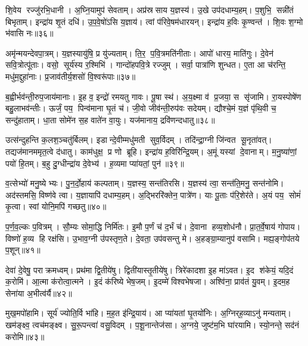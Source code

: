शि॒वेय रज्जु॑रभि॒धानी।
अ॒घ्नि॒यामुप॑ सेवताम्।
अप्र॑स्रसाय य॒ज्ञस्य॑।
उ॒खे उप॑दधाम्य॒हम्।
प॒शुभि॒ सन्नी॑तं बिभृताम्।
इन्द्रा॑य शृ॒तं दधि॑।
उ॒प॒वे॒षो॑ऽसि य॒ज्ञाय॑।
त्वां प॑रिवे॒षम॑धारयन्।
इन्द्रा॑य ह॒विः कृ॒ण्वन्त॑।
शि॒वः श॒ग्मो भ॑वासि नः॥३६॥

अमृ॑न्मयन्देवपा॒त्रम्।
य॒ज्ञस्यायु॑षि॒ प्र यु॑ज्यताम्।
ति॒र॒ प॒वि॒त्रमति॑नीताः।
आपो॑ धारय॒ माति॑गुः।
दे॒वेन॑ सवि॒त्रोत्पू॑ताः।
वसो॒ सूर्य॑स्य र॒श्मिभि॑।
गान्दो॑हपवि॒त्रे रज्जुम्।
सर्वा॒ पात्रा॑णि शुन्धत।
ए॒ता आ च॑रन्ति॒ मधु॑म॒द्दुहा॑नाः।
प्र॒जाव॑तीर्य॒शसो॑ वि॒श्वरू॑पाः॥३७॥

ब॒ह्वीर्भव॑न्ती॒रुप॒जाय॑मानाः।
इ॒ह व॒ इन्द्रो॑ रमयतु गावः।
पू॒षा स्थ॑।
अ॒य॒क्ष्मा व॑ प्र॒जया॒ स सृ॑जामि।
रा॒यस्पोषे॑ण बहु॒लाभव॑न्तीः।
ऊर्जं॒ पय॒ पिन्व॑माना घृ॒तं च॑।
जी॒वो जीव॑न्ती॒रुप॑वः सदेयम्।
द्यौश्चे॒मं य॒ज्ञं पृ॑थि॒वी च॒ सन्दु॑हाताम्।
धा॒ता सोमे॑न स॒ह वाते॑न वा॒युः।
यज॑मानाय॒ द्रवि॑णन्दधातु॥३८॥

उत्स॑न्दुहन्ति क॒लश॒ञ्चतु॑र्बिलम्।
इडान्दे॒वीम्मधु॑मती सुव॒र्विदम्।
तदि॑न्द्रा॒ग्नी जि॑न्वत सू॒नृता॑वत्।
तद्यज॑मानममृत॒त्वे द॑धातु।
काम॑धुक्ष॒ प्र णो ब्रूहि।
इन्द्रा॑य ह॒विरि॑न्द्रि॒यम्।
अ॒मूं यस्यां दे॒वानाम्।
म॒नु॒ष्या॑णां॒ पयो॑ हि॒तम्।
ब॒हु दु॒ग्धीन्द्रा॑य दे॒वेभ्य॑।
ह॒व्यमा प्या॑यतां॒ पुन॑॥३९॥

व॒त्सेभ्यो॑ मनु॒ष्येभ्यः।
पु॒न॒र्दो॒हाय॑ कल्पताम्।
य॒ज्ञस्य॒ सन्त॑तिरसि।
य॒ज्ञस्य॑ त्वा॒ सन्त॑ति॒मनु॒ सन्त॑नोमि।
अद॑स्तमसि॒ विष्ण॑वे त्वा।
य॒ज्ञायापि॑ दधाम्य॒हम्।
अ॒द्भिररि॑क्तेन॒ पात्रे॑ण।
याः पू॒ताः प॑रि॒शेर॑ते।
अ॒यं पय॒ सोमं॑ कृ॒त्वा।
स्वां योनि॒मपि॑ गच्छतु॥४०॥

प॒र्ण॒व॒ल्कः प॒वित्रम्।
सौ॒म्यः सोमा॒द्धि निर्मि॑तः।
इ॒मौ प॒र्णं च॑ द॒र्भं च॑।
दे॒वाना हव्य॒शोध॑नौ।
प्रा॒त॒र्वे॒षाय॑ गोपाय।
विष्णो॑ ह॒व्य हि रक्ष॑सि।
उ॒भाव॒ग्नी उ॑पस्तृण॒ते।
दे॒वता॒ उप॑वसन्तु मे।
अ॒हङ्ग्रा॒म्यानुप॑ वसामि।
मह्य॒ङ्गोप॑तये प॒शून्॥४१॥\anuvakamend[आभृ॑त इ॒मं गृ॑ह्णामि॒ पूर्व॒स्ताः पूर्व॒ परि॑गृह्णामि सभापा॒ला इन्द्र॑ज्येष्ठेभ्य॒ आदि॑त्य व्रतपते सुस॒म्भृता॑ मे स॒ह पु॑नातु गहि नो वि॒श्वरू॑पा दधातु॒ पुन॑र्गच्छतु प॒शून् (याः पु॒रस्ता॑दि॒मामूर्ज॑मि॒ह प्र॒जा इ॒ह प॒शवो॒ऽयं पि॑तृ॒णाम॒ग्निः।
)]

देवा॑ दे॒वेषु॒ पराक्रमध्वम्।
प्रथ॑मा द्वि॒तीये॑षु।
द्विती॑यास्तृ॒तीये॑षु।
त्रिरे॑कादशा इ॒ह मा॑ऽवत।
इ॒द श॑केयं॒ यदि॒दं क॒रोमि॑।
आ॒त्मा क॑रोत्वा॒त्मने।
इ॒दं क॑रिष्ये भेष॒जम्।
इ॒दम्मे॑ विश्वभेषजा।
अश्वि॑ना॒ प्राव॑तं यु॒वम्।
इ॒दम॒ह सेना॑या अ॒भीत्व॑र्यै॥४२॥

मुख॒मपो॑हामि।
सूर्य॑ ज्योति॒र्वि भा॑हि।
म॒ह॒त इ॑न्द्रि॒याय॑।
आ प्या॑यतां घृ॒तयो॑निः।
अ॒ग्निर्‌ह॒व्याऽनु॑ मन्यताम्।
खम॑ङ्क्ष्व॒ त्वच॑मङ्क्ष्व।
सु॒रू॒पन्त्वा॑ वसु॒विदम्।
प॒शू॒नान्तेज॑सा।
अ॒ग्नये॒ जुष्ट॑म॒भि घा॑रयामि।
स्यो॒नन्ते॒ सद॑नं करोमि॥४३॥

